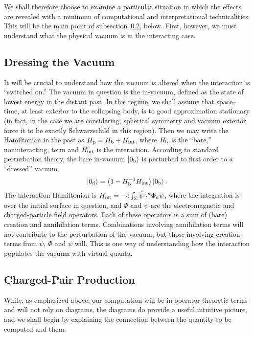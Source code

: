 \documentclass[11pt]{article}
\begin{document}
We shall therefore
choose to examine a particular situation in which the effects
are revealed with a minimum of computational and interpretational
technicalities.  This will be the main point of subsection~\ref{comp}, below.
First, however, we must understand what the physical vacuum is in the
interacting case.

\subsection{Dressing the Vacuum}

It will be crucial to understand how the vacuum is altered when the interaction
is ``switched on.''  The vacuum in question is the in-vacuum, defined as the
state of lowest energy in the distant past.  In this regime, we shall assume
that space--time, at least exterior to the collapsing body, is to good
approximation stationary (in fact, in the case we are considering, spherical
symmetry and vacuum exterior force it to be exactly Schwarzschild in this
region).  Then we may write the Hamiltonian in the past as $H_{\rm p}=H_{\rm
b}+H_{\rm int}$, where $H_{\rm b}$  is the ``bare,'' noninteracting, term and
$H_{\rm int}$ is the interaction.  According to standard perturbation theory,
the bare in-vacuum $|0_{\rm b}\rangle$ is perturbed to first order to a
``dressed'' vacuum
\begin{equation}
|0_{\rm d}\rangle =\left( 1-H_{\rm b}^{-1} H_{\rm int}\right) |0_{\rm b}\rangle
  \, .
\end{equation}
The interaction Hamiltonian is $H_{\rm int}=-e\int _\Sigma 
\tilde\psi \gamma ^a\Phi _a\psi $, where the integration is over the initial
surface in question, and $\Phi$ and $\psi$ are the electromagnetic and
charged-particle field operators.  Each of these operators is a sum of (bare)
creation and annihilation terms.  Combinations involving annihilation terms will
not contribute to the perturbation of the vacuum, but those involving creation
terms from $\tilde\psi$, $\Phi$ and $\psi$ will.  This is one way of
understanding how the interaction populates
the vacuum with virtual quanta.

\subsection{Charged-Pair Production}\label{comp}

While, as emphasized above, our computation will be in
operator-theoretic terms and will not rely on diagrams, the diagrams
do provide a useful intuitive picture, and we shall begin by
explaining the connection between the quantity to be computed and them.
\end{document}
